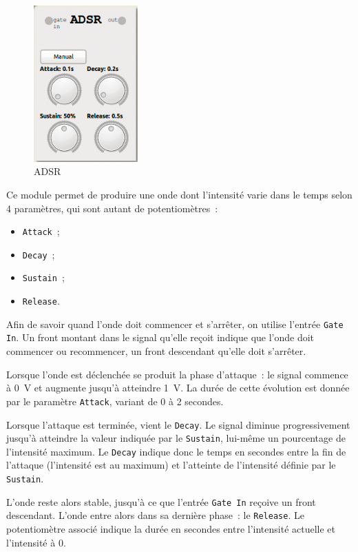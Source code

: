 \documentclass[a4paper,oneside,frenchb,10pt]{article}
\begin{document}
\begin{multicols}{2}
\begin{figure}[H]
\centering
\includegraphics[width=4cm]{../img/png/adsr.png}
\caption{ADSR}
\end{figure}

Ce module permet de produire une onde dont l'intensité varie dans le
temps selon 4 paramètres, qui sont autant de potentiomètres~:

\begin{itemize}
\item
  \verb!Attack!~;
\item
  \verb!Decay!~;
\item
  \verb!Sustain!~;
\item
  \verb!Release!.
\end{itemize}

Afin de savoir quand l'onde doit commencer et s'arrêter, on utilise
l'entrée \verb!Gate In!. Un front montant dans le signal qu'elle reçoit
indique que l'onde doit commencer ou recommencer, un front descendant
qu'elle doit s'arrêter.

Lorsque l'onde est déclenchée se produit la phase d'attaque~: le signal
commence à 0~V et augmente jusqu'à atteindre 1~V. La durée de cette
évolution est donnée par le paramètre \verb!Attack!, variant de 0 à 2
secondes.
\end{multicols}

Lorsque l'attaque est terminée, vient le \verb!Decay!. Le signal diminue
progressivement jusqu'à atteindre la valeur indiquée par le
\verb!Sustain!, lui-même un pourcentage de l'intensité maximum. Le
\verb!Decay! indique donc le temps en secondes entre la fin de l'attaque
(l'intensité est au maximum) et l'atteinte de l'intensité définie
par le \verb!Sustain!.

L'onde reste alors stable, jusqu'à ce que l'entrée \verb!Gate In!
reçoive un front descendant. L'onde entre alors dans sa dernière phase~:
le \verb!Release!. Le potentiomètre associé indique la durée en secondes
entre l'intensité actuelle et l'intensité à 0.
\end{document}
